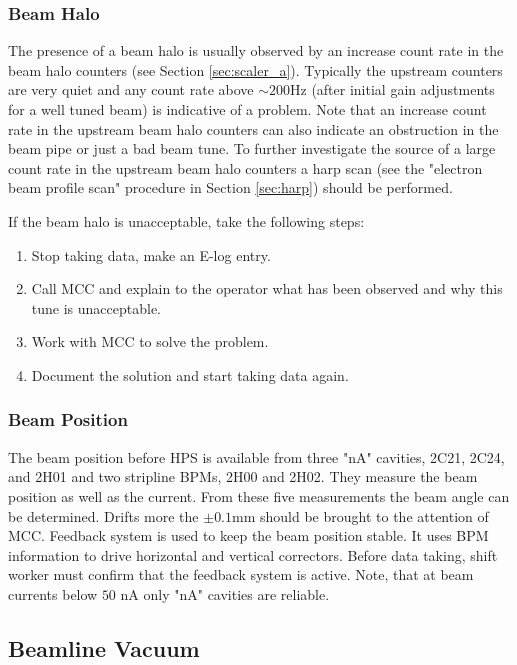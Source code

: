 \documentclass[12pt]{article}
\begin{document}
\subsubsection{Beam Halo}

The presence of a beam halo is usually observed by an increase count rate in
the beam halo counters (see Section \ref{sec:scaler_a}). Typically
the upstream counters are very quiet and any count rate above $\sim 200$Hz (after initial gain adjustments for a well tuned beam) is indicative
of a problem. Note that an increase count rate in the upstream beam halo counters
can also indicate an obstruction in the beam pipe or just a bad beam tune. To
further investigate the source of a large count rate in the upstream beam halo
counters a harp scan (see the "electron beam profile scan" procedure in Section \ref{sec:harp}) should be performed. 

If the beam halo is unacceptable, take the following steps:

\begin{enumerate}
\item Stop taking data, make an E-log entry.
\item Call MCC and explain to the operator what has been observed and why this tune
is unacceptable.
\item Work with MCC to solve the problem.
\item Document the solution and start taking data again.
\end{enumerate}

\subsubsection{Beam Position}

The beam position before HPS is available from three "nA" cavities, 2C21, 2C24, and 2H01 and two stripline BPMs, 2H00 and 2H02. They measure the beam position as well as the current. From
these five measurements the beam angle can be determined. Drifts more the \( \pm 0.1 \)mm
should be brought to the attention of MCC. Feedback system is used to keep the beam position stable. It uses BPM information to drive horizontal and vertical correctors. Before data taking, shift worker must confirm that the feedback system is active. Note, that at beam currents below $50$ nA only "nA" cavities are reliable. 

\subsection{Beamline Vacuum}
\end{document}
